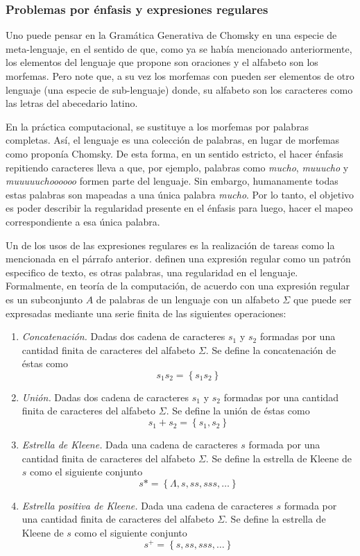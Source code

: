 \subsubsection{Problemas por énfasis y expresiones regulares}
Uno puede pensar en la Gramática Generativa de Chomsky en una especie de meta-lenguaje, en el sentido de que, como ya se había mencionado anteriormente, los elementos del lenguaje que propone son oraciones y el alfabeto son los morfemas. Pero note que, a su vez los morfemas con pueden ser elementos de otro lenguaje (una especie de sub-lenguaje) donde, su alfabeto son los caracteres como las letras del abecedario latino.

En la práctica computacional, se sustituye a los morfemas por palabras completas. Así, el lenguaje es una colección de palabras, en lugar de morfemas como proponía Chomsky. De esta forma, en un sentido estricto, el hacer énfasis repitiendo caracteres lleva a que, por ejemplo, palabras como \textit{mucho}, \textit{muuucho} y \textit{muuuuuchoooooo} formen parte del lenguaje. Sin embargo, humanamente todas estas palabras son mapeadas a una única palabra \textit{mucho}. Por lo tanto, el objetivo es poder describir la regularidad presente en el énfasis para luego, hacer el mapeo correspondiente a esa única palabra.

Un de los usos de las expresiones regulares es la realización de tareas como la mencionada en el párrafo anterior. \cite{goyvaerts2012regular} definen una expresión regular como un patrón especifico de texto, es otras palabras, una regularidad en el lenguaje. Formalmente, en teoría de la computación, de acuerdo con \cite{cohen1991introduction} una expresión regular es un subconjunto $A$ de palabras de un lenguaje con un alfabeto $\Sigma$ que puede ser expresadas mediante una serie finita de las siguientes operaciones:

\begin{enumerate}	
	\item \textit{Concatenación.} Dadas dos cadena de caracteres $s_1$ y $s_2$ formadas por una cantidad finita de caracteres del alfabeto $\Sigma$. Se define la concatenación de éstas como $$s_1s_2 = \left\lbrace s_1s_2 \right \rbrace$$
	
	\item \textit{Unión.} Dadas dos cadena de caracteres $s_1$ y $s_2$ formadas por una cantidad finita de caracteres del alfabeto $\Sigma$. Se define la unión de éstas como $$s_1+s_2 = \left\lbrace s_1, s_2 \right \rbrace$$
	
	\item \textit{Estrella de Kleene.} Dada una cadena de caracteres $s$ formada por una cantidad finita de caracteres del alfabeto $\Sigma$. Se define la estrella de Kleene de $s$ como el siguiente conjunto $$s* = \left\lbrace\Lambda, s, ss, sss, \ldots \right \rbrace$$
	
	\item \textit{Estrella positiva de Kleene.} Dada una cadena de caracteres $s$ formada por una cantidad finita de caracteres del alfabeto $\Sigma$. Se define la estrella de Kleene de $s$ como el siguiente conjunto $$s^{+} = \left\lbrace s, ss, sss, \ldots \right \rbrace$$	
\end{enumerate}

